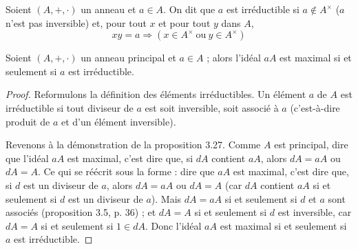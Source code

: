 \begin{definition}
    Soient $(A,+,\cdot)$ un anneau et $a\in A$. On dit que $a$ est irréductible si $a\notin A^\times$ ($a$ n'est pas inversible) et, pour tout $x$ et pour tout $y$ dans $A$,
    \[
    xy=a \Rightarrow (x\in A^\times \: \text{ou} \: y \in A^\times)
    \]
\end{definition}

\begin{proposition}
    Soient $(A, +, \cdot)$ un anneau principal et $a \in A$ ; alors l’idéal $aA$ est maximal si et seulement si $a$ est irréductible.
\end{proposition}

\begin{proof}
    Reformulons la définition des éléments irréductibles. Un élément $a$ de $A$ est irréductible si tout diviseur de $a$ est soit inversible, soit associé à $a$ (c’est-à-dire produit de $a$ et d’un élément inversible).

    Revenons à la démonstration de la proposition 3.27. Comme $A$ est principal, dire que l’idéal $aA$ est maximal, c’est dire que, si $dA$ contient $aA$, alors $dA = aA$ ou $dA = A$. Ce qui se réécrit sous la forme : dire que $aA$ est maximal, c’est dire que, si $d$ est un diviseur de $a$, alors $dA = aA$ ou $dA = A$ (car $dA$ contient $aA$ si et seulement si $d$ est un diviseur de $a$). Mais $dA = aA$ si et seulement si $d$ et $a$ sont associés (proposition 3.5, p. 36) ; et $dA = A$ si et seulement si $d$ est inversible, car $dA = A$ si et seulement si $1 \in dA$. Donc l’idéal $aA$ est maximal si et seulement si $a$ est irréductible.
\end{proof}